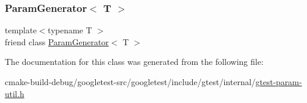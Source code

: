 \subsubsection{\texorpdfstring{ParamGenerator$<$ T $>$}{ParamGenerator< T >}}
{\footnotesize\ttfamily template$<$typename T $>$ \\
friend class \mbox{\hyperlink{classtesting_1_1internal_1_1ParamGenerator}{Param\+Generator}}$<$ T $>$\hspace{0.3cm}{\ttfamily [friend]}}



The documentation for this class was generated from the following file\+:\begin{DoxyCompactItemize}
\item 
cmake-\/build-\/debug/googletest-\/src/googletest/include/gtest/internal/\mbox{\hyperlink{gtest-param-util_8h}{gtest-\/param-\/util.\+h}}\end{DoxyCompactItemize}
